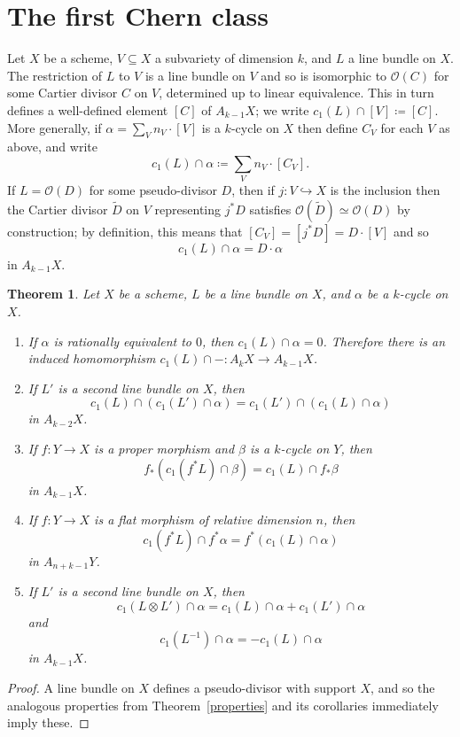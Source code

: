 \documentclass[leqno, openany]{memoir}
\newtheorem{thm}{Theorem}[section]
\theoremstyle{definition}
\theoremstyle{remark}
\theoremstyle{plain}
\theoremstyle{definition}
\theoremstyle{remark}
\newcommand{\mc}[1]{\mathcal{#1}}
\begin{document}
\section{The first Chern class}
Let $X$ be a scheme, $V \subseteq X$ a subvariety of dimension $k$, and $L$ a line bundle on $X$. The restriction of $L$ to $V$ is a line bundle on $V$ and so is isomorphic to $\mc{O}(C)$ for some Cartier divisor $C$ on $V$, determined up to linear equivalence. This in turn defines a well-defined element $[C]$ of $A_{k-1} X$; we write $c_1(L) \cap [V] \coloneqq [C]$. More generally, if $\alpha = \sum_V n_V \cdot [V]$ is a $k$-cycle on $X$ then define $C_V$ for each $V$ as above, and write \[ c_1(L) \cap \alpha \coloneqq \sum_V n_V \cdot [C_V] . \] If $L = \mc{O}(D)$ for some pseudo-divisor $D$, then if $j\colon V \hookrightarrow X$ is the inclusion then the Cartier divisor $\tilde D$ on $V$ representing $j^* D$ satisfies $\mc{O}(\tilde D) \simeq \mc{O}(D)$ by construction; by definition, this means that $[C_V] = [j^* D] = D \cdot [V]$ and so \[ c_1(L) \cap \alpha = D \cdot \alpha \] in $A_{k-1} X$.

\begin{thm}
\label{Chern properties}
Let $X$ be a scheme, $L$ be a line bundle on $X$, and $\alpha$ be a $k$-cycle on $X$.
\begin{enumerate}[label=(\alph*)]
\item If $\alpha$ is rationally equivalent to $0$, then $c_1(L) \cap \alpha = 0$. Therefore there is an induced homomorphism $c_1(L) \cap - \colon A_k X \to A_{k-1} X$.
\item If $L'$ is a second line bundle on $X$, then \[ c_1(L) \cap (c_1(L') \cap \alpha) = c_1(L') \cap (c_1(L) \cap \alpha) \] in $A_{k-2}X$.
\item If $f\colon Y \to X$ is a proper morphism and $\beta$ is a $k$-cycle on $Y$, then \[ f_* (c_1(f^* L) \cap \beta) = c_1(L) \cap f_* \beta \] in $A_{k-1} X$.
\item If $f\colon Y \to X$ is a flat morphism of relative dimension $n$, then \[ c_1(f^* L) \cap f^* \alpha = f^* (c_1(L) \cap \alpha) \] in $A_{n+k-1} Y$.
\item If $L'$ is a second line bundle on $X$, then \[ c_1(L \otimes L') \cap \alpha = c_1(L) \cap \alpha + c_1(L') \cap \alpha \] and \[ c_1(L^{-1}) \cap \alpha = - c_1(L) \cap \alpha \] in $A_{k-1} X$.
\end{enumerate}
\end{thm}
\begin{proof}
A line bundle on $X$ defines a pseudo-divisor with support $X$, and so the analogous properties from Theorem~\ref{properties} and its corollaries immediately imply these.
\end{proof}
\end{document}
